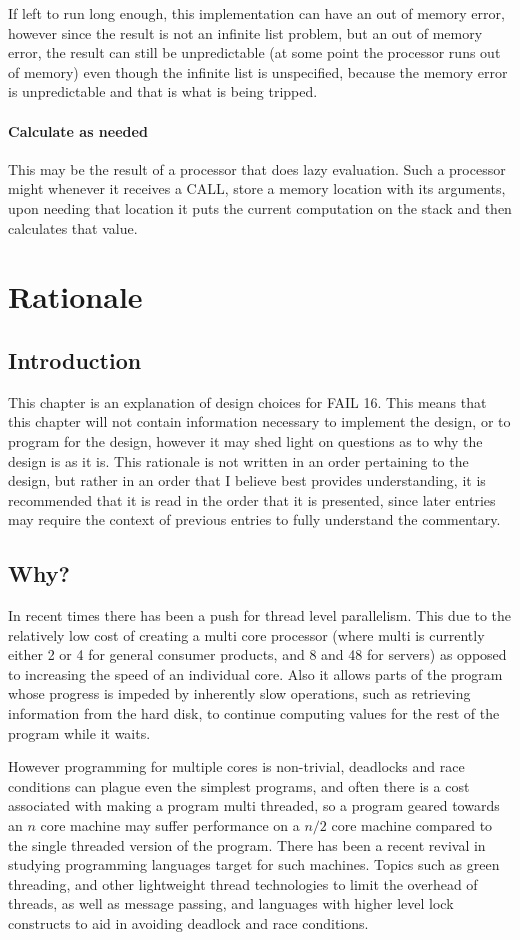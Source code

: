\documentclass[12pt,letterpaper]{report}
\begin{document}
If left to run long enough, this implementation can have an out of memory error, however since the result is not an infinite list problem, but an out of memory error, the result can still be unpredictable (at some point the processor runs out of memory) even though the infinite list is unspecified, because the memory error is unpredictable and that is what is being tripped.
\subsubsection{Calculate as needed}
This may be the result of a processor that does lazy evaluation. Such a processor might whenever it receives a CALL, store a memory location with its arguments, upon needing that location it puts the current computation on the stack and then calculates that value.
\chapter{Rationale}
\label{label:Rationale}
\section{Introduction}
This chapter is an explanation of design choices for FAIL 16. This means that this chapter will not contain information necessary to implement the design, or to program for the design, however it may shed light on questions as to why the design is as it is. This rationale is not written in an order pertaining to the design, but rather in an order that I believe best provides understanding, it is recommended that it is read in the order that it is presented, since later entries may require the context of previous entries to fully understand the commentary.
\section{Why?}
In recent times there has been a push for thread level parallelism. This due to the relatively low cost of creating a multi core processor (where multi is currently either 2 or 4 for general consumer products, and 8 and 48 for servers) as opposed to increasing the speed of an individual core. Also it allows parts of the program whose progress is impeded by inherently slow operations, such as retrieving information from the hard disk, to continue computing values for the rest of the program while it waits.

However programming for multiple cores is non-trivial, deadlocks and race conditions can plague even the simplest programs, and often there is a cost associated with making a program multi threaded, so a program geared towards an $n$ core machine may suffer performance on a $n/2$ core machine compared to the single threaded version of the program. There has been a recent revival in studying programming languages target for such machines. Topics such as green threading, and other lightweight thread technologies to limit the overhead of threads, as well as message passing, and languages with higher level lock constructs to aid in avoiding deadlock and race conditions.
\end{document}
